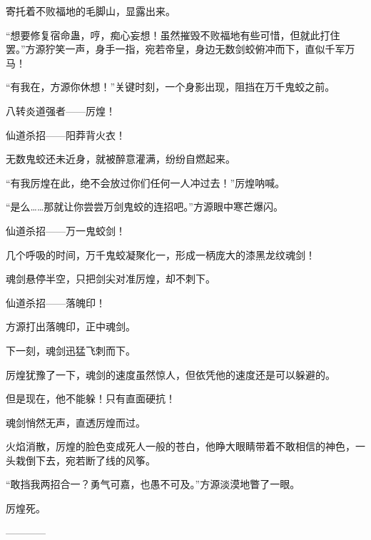\begin{this_body}
寄托着不败福地的毛脚山，显露出来。

“想要修复宿命蛊，哼，痴心妄想！虽然摧毁不败福地有些可惜，但就此打住罢。”方源狞笑一声，身手一指，宛若帝皇，身边无数剑蛟俯冲而下，直似千军万马！

“有我在，方源你休想！”关键时刻，一个身影出现，阻挡在万千鬼蛟之前。

八转炎道强者——厉煌！

仙道杀招——阳莽背火衣！

无数鬼蛟还未近身，就被醉意灌满，纷纷自燃起来。

“有我厉煌在此，绝不会放过你们任何一人冲过去！”厉煌呐喊。

“是么……那就让你尝尝万剑鬼蛟的连招吧。”方源眼中寒芒爆闪。

仙道杀招——万一鬼蛟剑！

几个呼吸的时间，万千鬼蛟凝聚化一，形成一柄庞大的漆黑龙纹魂剑！

魂剑悬停半空，只把剑尖对准厉煌，却不刺下。

仙道杀招——落魄印！

方源打出落魄印，正中魂剑。

下一刻，魂剑迅猛飞刺而下。

厉煌犹豫了一下，魂剑的速度虽然惊人，但依凭他的速度还是可以躲避的。

但是现在，他不能躲！只有直面硬抗！

魂剑悄然无声，直透厉煌而过。

火焰消散，厉煌的脸色变成死人一般的苍白，他睁大眼睛带着不敢相信的神色，一头栽倒下去，宛若断了线的风筝。

“敢挡我两招合一？勇气可嘉，也愚不可及。”方源淡漠地瞥了一眼。

厉煌死。

------------

\end{this_body}

